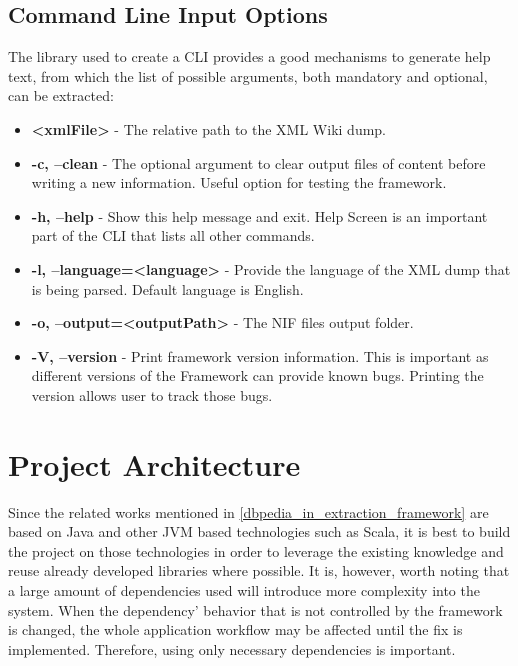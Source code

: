 \documentclass[thesis=M,english,hidelinks]{FITthesis}[2019/12/23]
\begin{document}
\subsection{Command Line Input Options}

The library used to create a \gls{CLI} provides a good mechanisms to generate help text, from which the list of possible arguments, both mandatory and optional, can be extracted:

\begin{itemize}
	\item  \textbf{\textless xmlFile\textgreater} - The relative path to the XML Wiki dump.
	\item \textbf{-c, --clean} - The optional argument to clear output files of content before writing a new information. Useful option for testing the framework.
	\item \textbf{-h, --help} - Show this help message and exit. Help Screen is an important part of the CLI that lists all other commands.
	\item \textbf{-l, --language=\textless language\textgreater} - Provide the language of the XML dump that is being parsed. Default language is English.
	\item \textbf{-o, --output=\textless outputPath\textgreater} - The NIF files output folder.
	\item \textbf{-V, --version} - Print framework version information. This is important as different versions of the Framework can provide known bugs. Printing the version allows user to track those bugs.
\end{itemize}

\section{Project Architecture}

Since the related works mentioned in \ref{dbpedia_in_extraction_framework} are based on Java and other \gls{JVM} based technologies such as Scala, it is best to build the project on those technologies in order to leverage the existing knowledge and reuse already developed libraries where possible. It is, however, worth noting that a large amount of dependencies used will introduce more complexity into the system. When the dependency' behavior that is not controlled by the framework is changed, the whole application workflow may be affected until the fix is implemented. Therefore, using only necessary dependencies is important.
\end{document}
